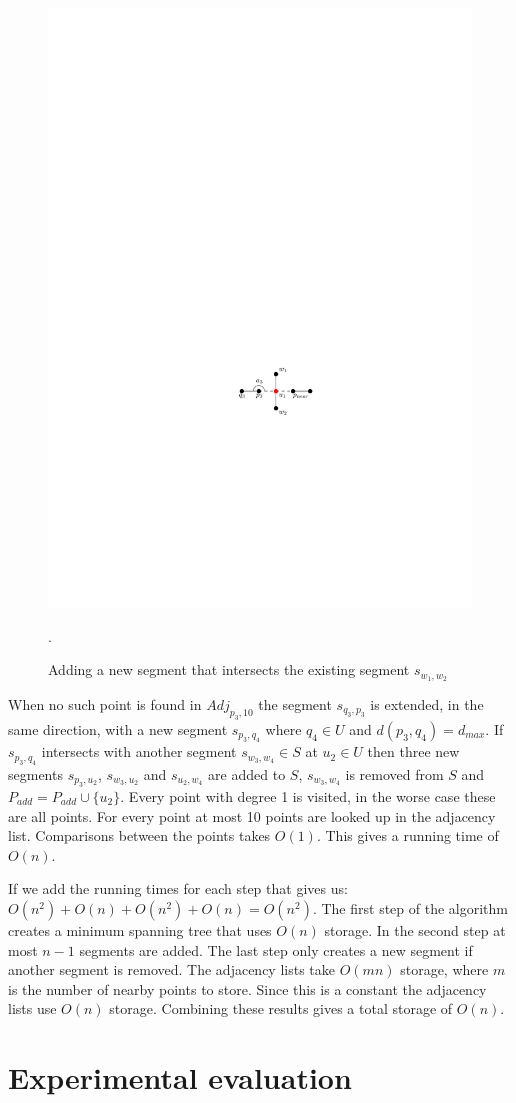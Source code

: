 \documentclass[11pt]{article}
\begin{document}
\begin{figure}[h]
\centering
      \graphicspath{ {images/}}
      \includegraphics[width=0.5\linewidth]{NetworkAddIntersection}
      \caption{Adding a new segment that intersects the existing segment $s_{w_1,w_2}$}.
      \label{addintersect}
  \end{figure}

When no such point is found in $Adj_{p_3,10}$ the segment $s_{q_3, p_3}$ is extended, in the same direction, with a new segment $s_{p_3,q_4}$ where $q_4 \in U$ and $d(p_3,q_4)=d_{max}$. If $s_{p_3,q_4}$ intersects with another segment $s_{w_3,w_4} \in S$ at $u_2 \in U$ then three new segments $s_{p_3,u_2}$, $s_{w_3,u_2}$ and $s_{u_2,w_4}$ are added to $S$, $s_{w_3,w_4}$ is removed from $S$ and $P_{add}=P_{add}\cup \{u_2\}$. Every point with degree 1 is visited, in the worse case these are all points. For every point at most 10 points are looked up in the adjacency list. Comparisons between the points takes $O(1)$. This gives a running time of $O(n)$.

If we add the running times for each step that gives us: $O(n^2)+O(n)+O(n^2)+O(n)=O(n^2)$. The first step of the algorithm creates a minimum spanning tree that uses $O(n)$ storage. In the second step at most $n-1$ segments are added. The last step only creates a new segment if another segment is removed. The adjacency lists take $O(mn)$ storage, where $m$ is the number of nearby points to store. Since this is a constant the adjacency lists use $O(n)$ storage. Combining these results gives a total storage of $O(n)$.


\section{Experimental evaluation}
\end{document}
